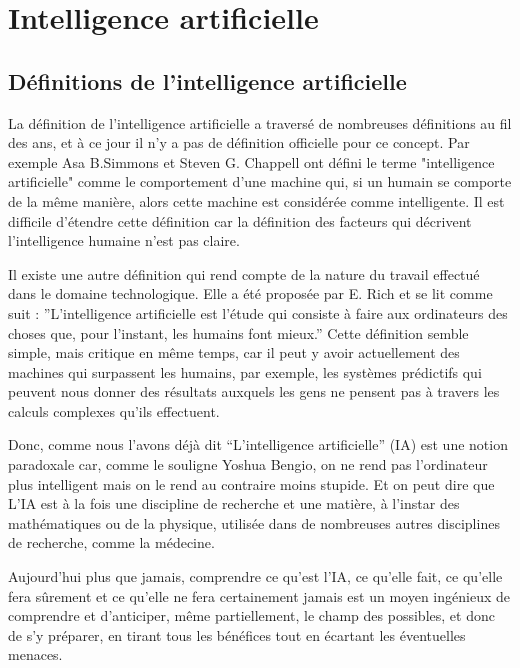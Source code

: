 \newpage

\section{Intelligence artificielle}
\subsection{Définitions de l’intelligence artificielle}
La définition de l'intelligence artificielle a traversé de nombreuses définitions au fil des ans, et à ce jour il n'y a pas de définition officielle pour ce concept. Par exemple Asa B.Simmons et Steven G. Chappell \cite{simmonsArtificialIntelligencedefinitionPractice1988} ont défini le terme "intelligence artificielle" comme le comportement d'une machine qui, si un humain se comporte de la même manière, alors cette machine est considérée comme intelligente. Il est difficile d'étendre cette définition car la définition des facteurs qui décrivent l'intelligence humaine n'est pas claire.

Il existe une autre définition qui rend compte de la nature du travail effectué dans le domaine technologique. Elle a été proposée par E. Rich \cite{richArtificialIntelligenceHumanities1985} et se lit comme suit : ”L'intelligence artificielle est l'étude qui consiste à faire aux ordinateurs des choses que, pour l'instant, les humains font mieux.” Cette définition semble simple, mais critique en même temps, car il peut y avoir actuellement des machines qui surpassent les humains, par exemple, les systèmes prédictifs qui peuvent nous donner des résultats auxquels les gens ne pensent pas à travers les calculs complexes qu'ils effectuent.

Donc, comme nous l'avons déjà dit “L’intelligence artificielle” (IA) est une notion paradoxale car, comme le souligne Yoshua Bengio, on ne rend pas l’ordinateur plus intelligent mais on le rend au contraire moins stupide. Et on peut dire que L’IA est à la fois une discipline de recherche et une matière, à l’instar des mathématiques ou de la physique, utilisée dans de nombreuses autres disciplines de recherche, comme la médecine\cite{WillMachinesEliminate}.

Aujourd'hui plus que jamais, comprendre ce qu'est l'IA, ce qu'elle fait, ce qu'elle fera sûrement et ce qu'elle ne fera certainement jamais est un moyen ingénieux de comprendre et d'anticiper, même partiellement, le champ des possibles, et donc de s'y préparer, en tirant tous les bénéfices tout en écartant les éventuelles menaces.

